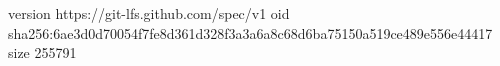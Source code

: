 version https://git-lfs.github.com/spec/v1
oid sha256:6ae3d0d70054f7fe8d361d328f3a3a6a8c68d6ba75150a519ce489e556e44417
size 255791
